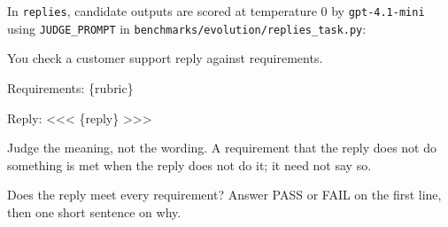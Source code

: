 \documentclass[10pt]{article}
\newenvironment{Shaded}{}{}
\newcommand{\NormalTok}[1]{#1}
\begin{document}
In \texttt{replies}, candidate outputs are scored at temperature 0 by
\texttt{gpt-4.1-mini} using \texttt{JUDGE\_PROMPT} in
\texttt{benchmarks/evolution/replies\_task.py}:

\begin{Shaded}
\begin{Highlighting}[]
\NormalTok{You check a customer support reply against requirements.}

\NormalTok{Requirements: \{rubric\}}

\NormalTok{Reply:}
\NormalTok{\textless{}\textless{}\textless{}}
\NormalTok{\{reply\}}
\NormalTok{\textgreater{}\textgreater{}\textgreater{}}

\NormalTok{Judge the meaning, not the wording. A requirement that the reply does not do}
\NormalTok{something is met when the reply does not do it; it need not say so.}

\NormalTok{Does the reply meet every requirement? Answer PASS or FAIL on the first line, then}
\NormalTok{one short sentence on why.}
\end{Highlighting}
\end{Shaded}
\end{document}
